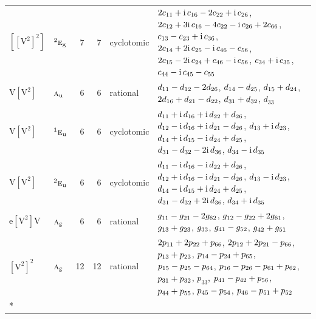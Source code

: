 \documentclass[10pt,a4paper]{article}
\numberwithin{equation}{section}
\newcommand{\irr}[1]{\text{\normalfont\scshape #1}}
\newcommand{\conjpair}[1]{{}^{#1}}
\newcommand{\ptag}[1]{\mathrm{#1}}
\newcommand{\iunit}{\mathrm{i}}
\newcommand{\jahn}[1]{\mathrm{#1}}
\newlength{\fillwidth}\newlength{\cellwidth}\newlength{\colwidth}
\newcommand{\signbreak}{\penalty100\relax}
\begin{document}
{\begin{longtable}{@{}llrrl>{\RaggedRight\arraybackslash}p{\fillwidth}@{}}
$\jahn{[[V^{2}]^{2}]}$ & $\conjpair{2}\irr{e}_{\ptag{g}}$ & 7 & 7 & cyclotomic & $2c_{11} +\signbreak \iunit{}\,c_{16} -\signbreak 2c_{22} +\signbreak \iunit{}\,c_{26}$, $2c_{12} +\signbreak 3\iunit{}\,c_{16} -\signbreak 4c_{22} -\signbreak \iunit{}\,c_{26} +\signbreak 2c_{66}$, $c_{13} -\signbreak c_{23} +\signbreak \iunit{}\,c_{36}$, $2c_{14} +\signbreak 2\iunit{}\,c_{25} -\signbreak \iunit{}\,c_{46} -\signbreak c_{56}$, $2c_{15} -\signbreak 2\iunit{}\,c_{24} +\signbreak c_{46} -\signbreak \iunit{}\,c_{56}$, $c_{34} +\signbreak \iunit{}\,c_{35}$, $c_{44} -\signbreak \iunit{}\,c_{45} -\signbreak c_{55}$\\
$\jahn{V[V^{2}]}$ & $\irr{a}_{\ptag{u}}$ & 6 & 6 & rational & $d_{11} -\signbreak d_{12} -\signbreak 2d_{26}$, $d_{14} -\signbreak d_{25}$, $d_{15} +\signbreak d_{24}$, $2d_{16} +\signbreak d_{21} -\signbreak d_{22}$, $d_{31} +\signbreak d_{32}$, $d_{33}$\\
$\jahn{V[V^{2}]}$ & $\conjpair{1}\irr{e}_{\ptag{u}}$ & 6 & 6 & cyclotomic & $d_{11} +\signbreak \iunit{}\,d_{16} +\signbreak \iunit{}\,d_{22} +\signbreak d_{26}$, $d_{12} -\signbreak \iunit{}\,d_{16} +\signbreak \iunit{}\,d_{21} -\signbreak d_{26}$, $d_{13} +\signbreak \iunit{}\,d_{23}$, $d_{14} +\signbreak \iunit{}\,d_{15} -\signbreak \iunit{}\,d_{24} +\signbreak d_{25}$, $d_{31} -\signbreak d_{32} -\signbreak 2\iunit{}\,d_{36}$, $d_{34} -\signbreak \iunit{}\,d_{35}$\\
$\jahn{V[V^{2}]}$ & $\conjpair{2}\irr{e}_{\ptag{u}}$ & 6 & 6 & cyclotomic & $d_{11} -\signbreak \iunit{}\,d_{16} -\signbreak \iunit{}\,d_{22} +\signbreak d_{26}$, $d_{12} +\signbreak \iunit{}\,d_{16} -\signbreak \iunit{}\,d_{21} -\signbreak d_{26}$, $d_{13} -\signbreak \iunit{}\,d_{23}$, $d_{14} -\signbreak \iunit{}\,d_{15} +\signbreak \iunit{}\,d_{24} +\signbreak d_{25}$, $d_{31} -\signbreak d_{32} +\signbreak 2\iunit{}\,d_{36}$, $d_{34} +\signbreak \iunit{}\,d_{35}$\\
$\jahn{e[V^{2}]V}$ & $\irr{a}_{\ptag{g}}$ & 6 & 6 & rational & $\mathnormal{g}_{11} -\signbreak \mathnormal{g}_{21} -\signbreak 2\mathnormal{g}_{62}$, $\mathnormal{g}_{12} -\signbreak \mathnormal{g}_{22} +\signbreak 2\mathnormal{g}_{61}$, $\mathnormal{g}_{13} +\signbreak \mathnormal{g}_{23}$, $\mathnormal{g}_{33}$, $\mathnormal{g}_{41} -\signbreak \mathnormal{g}_{52}$, $\mathnormal{g}_{42} +\signbreak \mathnormal{g}_{51}$\\
$\jahn{[V^{2}]^{2}}$ & $\irr{a}_{\ptag{g}}$ & 12 & 12 & rational & $2p_{11} +\signbreak 2p_{22} +\signbreak p_{66}$, $2p_{12} +\signbreak 2p_{21} -\signbreak p_{66}$, $p_{13} +\signbreak p_{23}$, $p_{14} -\signbreak p_{24} +\signbreak p_{65}$, $p_{15} -\signbreak p_{25} -\signbreak p_{64}$, $p_{16} -\signbreak p_{26} -\signbreak p_{61} +\signbreak p_{62}$, $p_{31} +\signbreak p_{32}$, $p_{33}$, $p_{41} -\signbreak p_{42} +\signbreak p_{56}$, $p_{44} +\signbreak p_{55}$, $p_{45} -\signbreak p_{54}$, $p_{46} -\signbreak p_{51} +\signbreak p_{52}$\\*

\end{longtable}}
\end{document}
